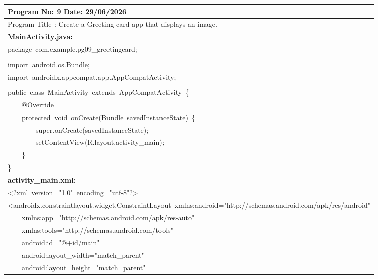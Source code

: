 \documentclass[a4paper,12pt]{article}
\begin{document}
\noindent\begingroup
\renewcommand{\arraystretch}{1.1}
\begin{longtable}{|p{}|}
\hline\endfirsthead\hline\endhead\hline\endfoot\hline\endlastfoot
\rule{0pt}{13pt}Program No: 9 \hfill Date: 29/06/2026 \\
\hline
\rule{0pt}{13pt}Program Title : Create a Greeting card app that displays an image. \\
\hline
\rule{0pt}{13pt}\textbf{MainActivity.java:} \\
\hline
{\ttfamily\small package\ com.example.pg09\_greetingcard;} \\
\strut \\
{\ttfamily\small import\ android.os.Bundle;} \\
{\ttfamily\small import\ androidx.appcompat.app.AppCompatActivity;} \\
\strut \\
{\ttfamily\small public\ class\ MainActivity\ extends\ AppCompatActivity\ \{} \\
{\ttfamily\small \ \ \ \ @Override} \\
{\ttfamily\small \ \ \ \ protected\ void\ onCreate(Bundle\ savedInstanceState)\ \{} \\
{\ttfamily\small \ \ \ \ \ \ \ \ super.onCreate(savedInstanceState);} \\
{\ttfamily\small \ \ \ \ \ \ \ \ setContentView(R.layout.activity\_main);} \\
{\ttfamily\small \ \ \ \ \}} \\
{\ttfamily\small \}} \\
\hline
\rule{0pt}{13pt}\textbf{activity\_main.xml:} \\
\hline
{\ttfamily\small \textless{}?xml\ version="1.0"\ encoding="utf-8"?\textgreater{}} \\
{\ttfamily\small \textless{}androidx.constraintlayout.widget.ConstraintLayout\ xmlns:android="http://schemas.android.com/apk/res/android"} \\
{\ttfamily\small \ \ \ \ xmlns:app="http://schemas.android.com/apk/res-auto"} \\
{\ttfamily\small \ \ \ \ xmlns:tools="http://schemas.android.com/tools"} \\
{\ttfamily\small \ \ \ \ android:id="@+id/main"} \\
{\ttfamily\small \ \ \ \ android:layout\_width="match\_parent"} \\
{\ttfamily\small \ \ \ \ android:layout\_height="match\_parent"} \\

\end{longtable}
\end{document}
